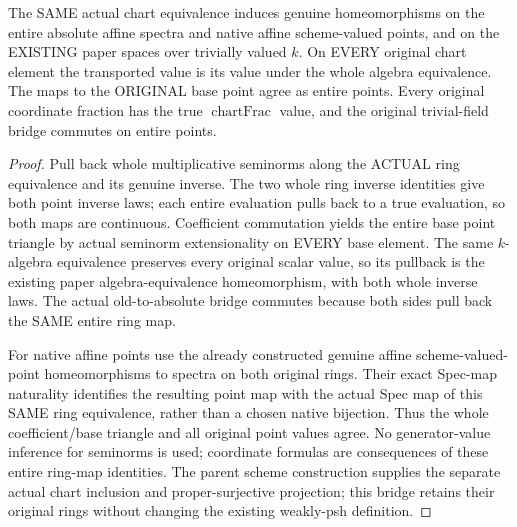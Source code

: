\begin{theorem}
\label{paper:actual-rees-original-blowup-points}
\leanok
The SAME actual chart equivalence induces genuine homeomorphisms on the
entire absolute affine spectra and native affine scheme-valued points,
and on the EXISTING paper spaces over trivially valued $k$.
On EVERY original chart element the transported value is its value under
the whole algebra equivalence. The maps to the ORIGINAL base point agree
as entire points. Every original coordinate fraction has the true
$\operatorname{chartFrac}$ value, and the original trivial-field bridge
commutes on entire points.
\end{theorem}
\begin{proof}
Pull back whole multiplicative seminorms along the ACTUAL ring equivalence
and its genuine inverse. The two whole ring inverse identities give both
point inverse laws; each entire evaluation pulls back to a true evaluation,
so both maps are continuous. Coefficient commutation yields the entire base
point triangle by actual seminorm extensionality on EVERY base element.
The same $k$-algebra equivalence preserves every original scalar value,
so its pullback is the existing paper algebra-equivalence homeomorphism,
with both whole inverse laws. The actual old-to-absolute bridge
commutes because both sides pull back the SAME entire ring map.

For native affine points use the already constructed genuine affine
scheme-valued-point homeomorphisms to spectra on both original rings.
Their exact Spec-map naturality identifies the resulting point map with
the actual Spec map of this SAME ring equivalence, rather than a chosen
native bijection. Thus the whole coefficient/base triangle and all original
point values agree. No generator-value inference for seminorms is used;
coordinate formulas are consequences of these entire ring-map identities.
The parent scheme construction supplies the separate actual chart inclusion
and proper-surjective projection; this bridge retains their original rings
without changing the existing weakly-psh definition.
\end{proof}

